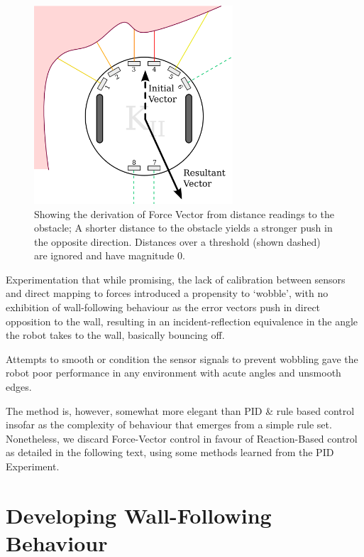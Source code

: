 \documentclass[11pt, a4paper]{article}
\begin{document}
\begin{figure}[h]
  \begin{center}
    \includegraphics[width=20em]{../assets/force-vector.png}
    \caption{Showing the derivation of Force Vector from distance readings to the
      obstacle; A shorter distance to the obstacle yields a stronger push in the 
      opposite direction. Distances over a threshold (shown dashed) are ignored 
      and have magnitude $0$.}
  \end{center}
\end{figure}

Experimentation that while promising, the lack of calibration between sensors and 
direct mapping to forces introduced a propensity to `wobble', with no exhibition of 
wall-following behaviour as the error vectors push in direct opposition to the wall, 
resulting in an incident-reflection equivalence in the angle the robot takes to the 
wall, basically bouncing off.

Attempts to smooth or condition the sensor signals to prevent wobbling gave the robot 
poor performance in any environment with acute angles and unsmooth edges.

The method is, however, somewhat more elegant than PID \& rule based control insofar 
as the complexity of behaviour that emerges from a simple rule set. Nonetheless, we 
discard Force-Vector control in favour of Reaction-Based control as detailed in the 
following text, using some methods learned from the PID Experiment.



\section{Developing Wall-Following Behaviour}
\end{document}
